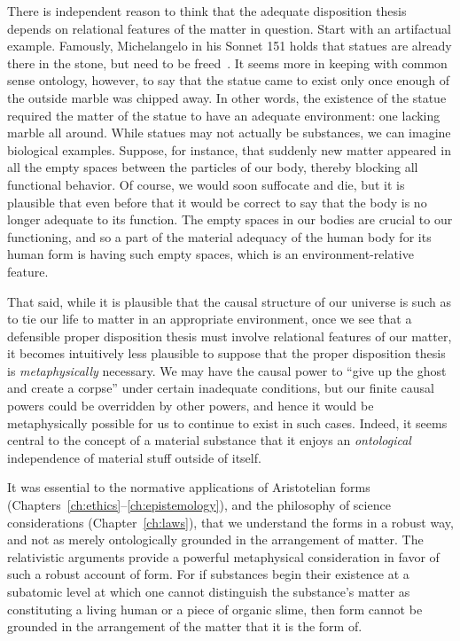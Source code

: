 There is independent reason to think that the adequate disposition thesis depends on relational features of the matter in 
question. Start with an artifactual example. Famously, Michelangelo in his Sonnet 151 holds that statues are already there in the 
stone, but need to be freed~\cite{Nims}. It seems more in keeping with common sense ontology, however, to say that the statue came 
to exist only once enough of the outside marble was chipped away. In other words, the existence of the statue required the 
matter of the statue to have an adequate environment: one lacking marble all around. While statues may not actually be substances,
we can imagine biological examples. Suppose, for instance, that suddenly new matter appeared in all the empty spaces between the particles of our body, thereby blocking all functional behavior. Of course, we would soon suffocate and die, but it is plausible
that even before that it would be correct to say that the body is no longer adequate to its function. The empty spaces
in our bodies are crucial to our functioning, and so a part of the material adequacy of the human body for its human form 
is having such empty spaces, which is an environment-relative feature.

That said, while it is plausible that the causal structure of our universe is such as to tie our life to matter in an
appropriate environment, once we see that a defensible proper disposition thesis must involve relational features of our matter, it 
becomes intuitively less plausible to suppose that the proper disposition thesis is \textit{metaphysically} necessary. We may have 
the causal power to ``give up the ghost and create a corpse'' under certain inadequate conditions, but 
our finite causal powers could be overridden by other powers, and hence it would be metaphysically possible for us to continue to 
exist in such cases. Indeed, it seems central to the concept of a material substance that it enjoys an \textit{ontological} independence of material stuff outside of itself. 

It was essential to the normative applications of Aristotelian forms (Chapters~\ref{ch:ethics}--\ref{ch:epistemology}), and the philosophy of science
considerations (Chapter~\ref{ch:laws}), that we understand
the forms in a robust way, and not as merely ontologically grounded in the arrangement of matter. The relativistic arguments provide a powerful metaphysical consideration in favor of such a robust account of form. For if substances begin their existence
at a subatomic level at which one cannot distinguish the substance's matter as constituting a living human or a piece of organic
slime, then form cannot be grounded in the arrangement of the matter that it is the form of. 

